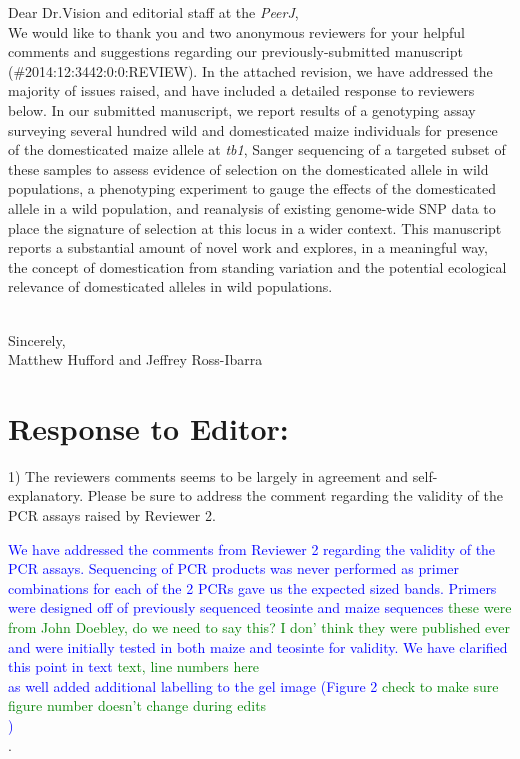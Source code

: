 \documentclass[11pt]{article}
\newcommand{\res}[1]{\noindent \textcolor{blue}{{#1}} \\}
\newcommand{\lev}[1]{\noindent \textcolor{green}{{#1}} \\}
\begin{document}
\noindent Dear Dr.Vision and editorial staff at the \emph{PeerJ}, \\

We would like to thank you and two anonymous reviewers for your helpful comments and suggestions regarding our previously-submitted manuscript (\#2014:12:3442:0:0:REVIEW).  In the attached revision, we have addressed the majority of issues raised, and have included a detailed response to reviewers below.  In our submitted manuscript, we report results of a genotyping assay surveying several hundred wild and domesticated maize individuals for presence of the domesticated maize allele at \emph{tb1}, Sanger sequencing of a targeted subset of these samples to assess evidence of selection on the domesticated allele in wild populations, a phenotyping experiment to gauge the effects of the domesticated allele in a wild population, and reanalysis of existing genome-wide SNP data to place the signature of selection at this locus in a wider context.  This manuscript reports a substantial amount of novel work and explores, in a meaningful way, the concept of domestication from standing variation and the potential ecological relevance of domesticated alleles in wild populations.\\\

\noindent Sincerely,\\

\noindent Matthew Hufford and Jeffrey Ross-Ibarra

\section*{Response to Editor:}

1) The reviewers comments seems to be largely in agreement and self-explanatory. Please be sure to address the comment regarding the validity of the PCR assays raised by Reviewer 2.

\res{We have addressed the comments from Reviewer 2 regarding the validity of the PCR assays. Sequencing of PCR products was never performed as primer combinations for each of the 2 PCRs gave us the expected sized bands. Primers were designed off of previously sequenced teosinte and maize sequences \lev{these were from John Doebley, do we need to say this? I don' think they were published ever} and were initially tested in both maize and teosinte for validity.  We have clarified this point in text \lev{text, line numbers here} as well added additional labelling to the gel image (Figure 2 \lev{check to make sure figure number doesn't change during edits})}. 
\end{document}
